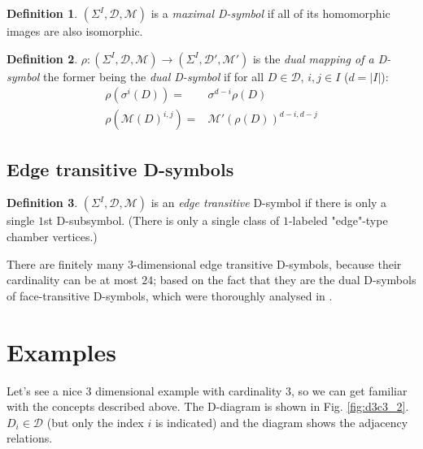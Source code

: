\documentclass[12pt,a4paper]{article}
\theoremstyle{plain}%
\newtheorem{prop}[thm]{Proposition}
\theoremstyle{definition}
\newtheorem{defn}{Definition}[section]
\theoremstyle{remark}
\begin{document}
\begin{defn}
  $(\Sigma^I,\mathcal{D},\mathcal{M})$ is a {\em maximal D-symbol} if all of its
  homomorphic images are also isomorphic.
\end{defn}

\begin{defn}
  $\rho: (\Sigma^I,\mathcal{D},\mathcal{M}) \rightarrow
  (\Sigma^I,\mathcal{D}',\mathcal{M}')$ is the {\em dual mapping of a D-symbol}
  the former being the {\em dual D-symbol} if for all $D\in \mathcal{D}$, $i,j
  \in I$ ($d=|I|$):
  \begin{align}
    \rho(\sigma^i(D))= & \sigma^{d-i}\rho(D) \\
    \rho(\mathcal{M}(D)^{i,j})= & \mathcal{M}'(\rho(D))^{d-i,d-j}
  \end{align}
\end{defn}


\subsection{Edge transitive D-symbols}

\begin{defn}
  $(\Sigma^I,\mathcal{D},\mathcal{M})$ is an {\em edge transitive} D-symbol if
  there is only a single $1$st D-subsymbol. (There is only a single class of
  $1$-labeled "edge"-type chamber vertices.)
\end{defn}

There are finitely many $3$-dimensional edge transitive D-symbols, because their
cardinality can be at most $24$; based on the fact that they are the dual
D-symbols of face-transitive D-symbols, which were thoroughly analysed in
\cite{DHM93}.

\section{Examples}

Let's see a nice $3$ dimensional example with cardinality $3$, so we can get
familiar with the concepts described above. The D-diagram is shown in Fig.
\ref{fig:d3c3_2}. $D_i\in \mathcal{D}$ (but only the index $i$ is indicated) and
the diagram shows the adjacency relations.
\end{document}
